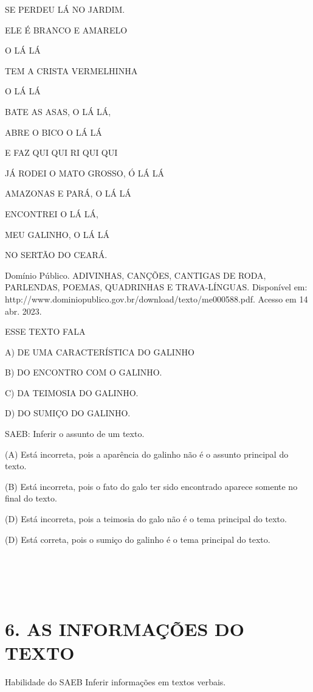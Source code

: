 SE PERDEU LÁ NO JARDIM.

ELE É BRANCO E AMARELO

O LÁ LÁ

TEM A CRISTA VERMELHINHA

O LÁ LÁ

BATE AS ASAS, O LÁ LÁ,

ABRE O BICO O LÁ LÁ

E FAZ QUI QUI RI QUI QUI

JÁ RODEI O MATO GROSSO, Ó LÁ LÁ

AMAZONAS E PARÁ, O LÁ LÁ

ENCONTREI O LÁ LÁ,

MEU GALINHO, O LÁ LÁ

NO SERTÃO DO CEARÁ.

Domínio Público. ADIVINHAS, CANÇÕES, CANTIGAS DE RODA, PARLENDAS, POEMAS, QUADRINHAS E TRAVA-LÍNGUAS. Disponível em: http://www.dominiopublico.gov.br/download/texto/me000588.pdf. Acesso em 14 abr. 2023.

ESSE TEXTO FALA

A) DE UMA CARACTERÍSTICA DO GALINHO

B) DO ENCONTRO COM O GALINHO.

C) DA TEIMOSIA DO GALINHO.

D) DO SUMIÇO DO GALINHO.

SAEB: Inferir o assunto de um texto.

(A) Está incorreta, pois a aparência do galinho não é o assunto principal do texto.

(B) Está incorreta, pois o fato do galo ter sido encontrado aparece somente no final do texto.

(D) Está incorreta, pois a teimosia do galo não é o tema principal do texto.

(D) Está correta, pois o sumiço do galinho é o tema principal do texto.

\section{\texorpdfstring{\\
}{ }}\label{section-19}

\section{6. AS INFORMAÇÕES DO
TEXTO}\label{muxf3dulo-6-as-informauxe7uxf5es-do-texto}

\protect\hypertarget{_heading=h.1pxezwc}{}{}Habilidade do SAEB
Inferir informações em textos verbais.

